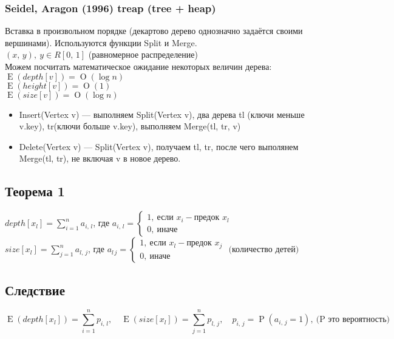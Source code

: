 \documentclass[12pt, a4paper]{article}
\begin{document}
    \subsubsection{Seidel, Aragon (1996) treap (tree + heap)}
    Вставка в произвольном порядке (декартово дерево однозначно задаётся своими вершинами). Используются функции Split и Merge.\\
    $(x,\, y),\ y\in R[0,\, 1]$ (равномерное распределение)\\
    Можем посчитать математическое ожидание некоторых величин дерева:\\
    $\operatorname{E}(depth[v]) = \operatorname O(\log n) $\\
    $\operatorname{E}(height[v]) = \operatorname O(1)$\\
    $\operatorname{E}(size[v]) = \operatorname O(\log n)$\\
    \begin{itemize}
        \item Insert(Vertex v) --- выполняем Split(Vertex v), два дерева tl (ключи меньше v.key), tr(ключи больше v.key), выполняем Merge(tl, tr, v)
        \item Delete(Vertex v) --- Split(Vertex v), получаем tl, tr, после чего выполянем Merge(tl, tr), не включая v в новое дерево.
    \end{itemize}
    \subsection{Теорема 1}
    $depth[x_l] =\displaystyle \sum\limits_{i = 1}^n a_{i,\, l}$, где $a_{i,\, l} = \begin{cases}
        1,\ \text{если } x_i - \text{предок }x_l\\
        0,\ \text{иначе}
    \end{cases}$ \\
    $size[x_l] =\displaystyle \sum\limits_{j = 1}^n a_{l,\, j}$, где $a_{l\, j} = \begin{cases}
        1,\ \text{если } x_l - \text{предок }x_j\\
        0,\ \text{иначе}
    \end{cases} \text{ (количество детей)}$

    \subsection{Следствие}
    \[\operatorname{E}(depth[x_l]) = \sum_{i = 1}^{n} p_{i,\, l},\quad \operatorname{E}(size[x_l]) = \sum_{j = 1}^{n} p_{l,\, j},\quad p_{i,\, j} = \operatorname{P}(a_{i,\, j} = 1),\ \text{(P это вероятность)}\]
\end{document}
